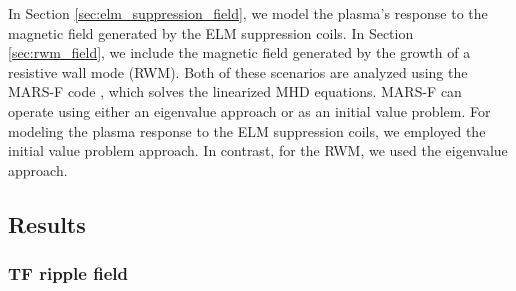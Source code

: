 \documentclass[10pt, a4paper, twoside]{article}
\begin{document}
In Section \ref{sec:elm_suppression_field}, we model the plasma's response to the magnetic field generated by the ELM suppression coils. In Section \ref{sec:rwm_field}, we include the magnetic field generated by the growth of a resistive wall mode (RWM). Both of these scenarios are analyzed using the MARS-F code \cite{liu2015}, which solves the linearized MHD equations. MARS-F can operate using either an eigenvalue approach or as an initial value problem. For modeling the plasma response to the ELM suppression coils, we employed the initial value problem approach. In contrast, for the RWM, we used the eigenvalue approach.


\subsection{Results}

\subsubsection{TF ripple field}
\label{sec:tf_ripple_field}
\end{document}
